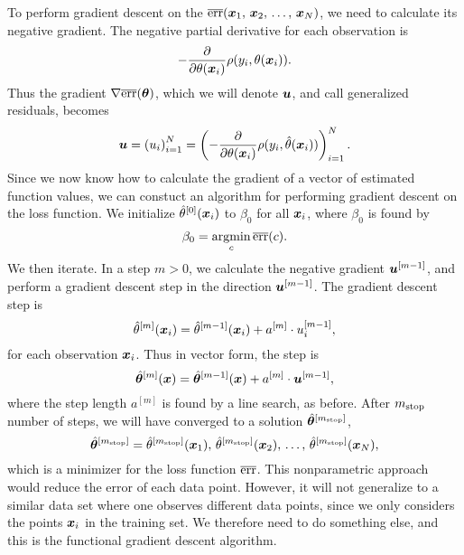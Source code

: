 To perform gradient descent on the $\overline{\text{err}}(\bm{x}_1,\,\bm{x}_2,\,\ldots,\,\bm{x}_N)$, we need to calculate its negative gradient.
The negative partial derivative for each observation is
\begin{equation*}
    -\frac{\partial}{\partial\theta(\bm{x}_i)} \rho(y_i,\theta(\bm{x}_i)).
\end{equation*}
Thus the gradient $\nabla \overline{\text{err}}(\boldsymbol{\theta})$, which we will denote $\bm{u}$, and call generalized residuals, becomes
\begin{equation*}
    \bm{u}=\left(u_i\right)_{i=1}^N=\left(-\frac{\partial}{\partial \theta(\bm{x}_i)}\rho(y_i, \hat{\theta}(\bm{x}_i))\right)_{i=1}^N.
\end{equation*}
Since we now know how to calculate the gradient of a vector of estimated function values, we can constuct an algorithm for performing gradient descent on the loss function.
We initialize $\hat{\theta}^{[0]}(\bm{x}_i)$ to $\beta_0$ for all $\bm{x}_i$, where $\beta_0$ is found by
\begin{equation*}
    \beta_0=\operatorname*{argmin}_{c}\overline{\text{err}}(c).
\end{equation*}
We then iterate.
In a step $m>0$, we calculate the negative gradient $\bm{u}^{[m-1]}$, and perform a gradient descent step in the direction $\bm{u}^{[m-1]}$.
The gradient descent step is
\begin{equation*}
    \hat{\theta}^{[m]}(\bm{x}_i)=\hat{\theta}^{[m-1]}(\bm{x}_i)+a^{[m]}\cdot u_i^{[m-1]},
\end{equation*}
for each observation $\bm{x}_i$.
Thus in vector form, the step is
\begin{equation*}
    \hat{\boldsymbol{\theta}}^{[m]}(\bm{x})=\hat{\boldsymbol{\theta}}^{[m-1]}(\bm{x})+a^{[m]}\cdot \bm{u}^{[m-1]},
\end{equation*}
where the step length $a^{[m]}$ is found by a line search, as before.
After $m_{\text{stop}}$ number of steps, we will have converged to a solution $\hat{\boldsymbol{\theta}}^{[m_{\text{stop}}]}$,
\begin{equation*}
    \hat{\boldsymbol{\theta}}^{[m_{\text{stop}}]}=\hat{\theta}^{[m_{\text{stop}}]}(\bm{x}_1),\,\hat{\theta}^{[m_{\text{stop}}]}(\bm{x}_2),\,\ldots,\,\hat{\theta}^{[m_{\text{stop}}]}(\bm{x}_N),
\end{equation*}
which is a minimizer for the loss function $\overline{\text{err}}$.
This nonparametric approach would reduce the error of each data point.
However, it will not generalize to a similar data set where one observes different data points, since we only considers the points $\bm{x}_i$ in the training set.
We therefore need to do something else, and this is the functional gradient descent algorithm.


